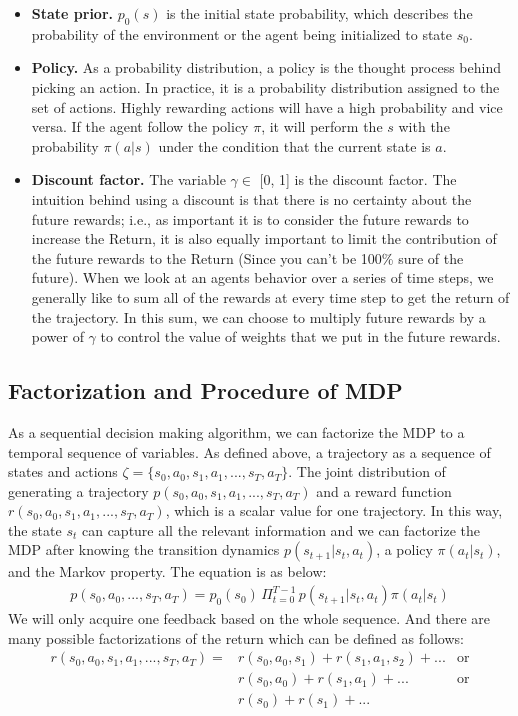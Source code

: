 \documentclass[11pt]{article}
\begin{document}
\begin{itemize}
    \item \textbf{State prior.} $p_0(s)$ is the initial state probability, which describes the probability of the environment or the agent being initialized to state $s_0$.
    
    \item \textbf{Policy.} As a probability distribution, a policy is the thought process behind picking an action. In practice, it is a probability distribution assigned to the set of actions. Highly rewarding actions will have a high probability and vice versa. If the agent follow the policy $\pi$, it will perform the $s$ with the probability $\pi (a|s)$ under the condition that the current state is $a$.
    
    \item \textbf{Discount factor.} The variable $\gamma \in$ [0, 1] is the discount factor. The intuition behind using a discount is that there is no certainty about the future rewards; i.e., as important it is to consider the future rewards to increase the Return, it is also equally important to limit the contribution of the future rewards to the Return (Since you can’t be 100\% sure of the future). When we look at an agents behavior over a series of time steps, we generally like to sum all of the rewards at every time step to get the return of the trajectory. In this sum, we can choose to multiply future rewards by a power of $\gamma$ to control the value of weights that we put in the future rewards.
\end{itemize}

\subsection{Factorization and Procedure of MDP}

As a sequential decision making algorithm, we can factorize the MDP to a temporal sequence of variables. As defined above, a trajectory as a sequence of states and actions $\zeta = \{s_0, a_0, s_1, a_1, ..., s_T, a_T\}$. The joint distribution of generating a trajectory $p(s_0, a_0, s_1, a_1, ..., s_T, a_T)$ and a reward function $r(s_0, a_0, s_1, a_1, ..., s_T, a_T)$, which is a scalar value for one trajectory. In this way, the state $s_t$ can capture all the relevant information and we can factorize the MDP after knowing the transition dynamics $p(s_{t+1}|s_t, a_t)$, a policy $\pi(a_t|s_t)$, and the Markov property. The equation is as below:
\begin{align*}
p(s_0, a_0, ..., s_T, a_T) = p_0(s_0)\,\Pi_{t=0}^{T-1}\,p(s_{t+1}|s_t, a_t)\pi(a_t|s_t)
\end{align*}
We will only acquire one feedback based on the whole sequence. And there are many possible factorizations of the return which can be defined as follows:
\begin{align*}
    r(s_0, a_0, s_1, a_1, ..., s_T, a_T) =  & r(s_0, a_0, s_1) + r(s_1, a_1, s_2) + ...  & \textrm{or}\\
      & r(s_0, a_0) + r(s_1, a_1) + ... & \textrm{or}\\
      & r(s_0) + r(s_1) + ...
\end{align*}
\end{document}
